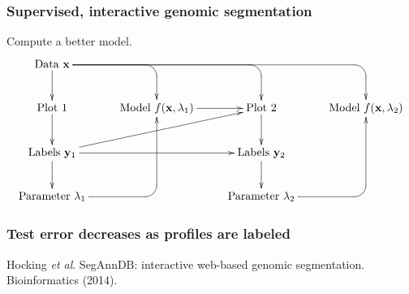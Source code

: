 \documentclass{beamer}
\begin{document}
\begin{frame}
  \frametitle{Supervised, interactive genomic segmentation}
  Compute a better model.
  \small
  \begin{displaymath}
  \xymatrix{
    \text{Data $\mathbf x$}
    \ar `[r] [dr] 
    \ar `r[rr] [drr] 
    \ar `r[rrr] [drrr] 
    \ar [d]
    & \text{ }
    & \text{ }
    & \text{ }
    \\
    \text{Plot 1} 
    \ar [d]
    & 
    \text{Model $f(\mathbf x, \lambda_1)$} 
    \ar [r]
    &
    \text{Plot 2} 
    \ar [d]
    & 
    \text{Model $f(\mathbf x, \lambda_2)$} 
    \\
    \text{Labels $\mathbf y_1$}       
    \ar [d]
    \ar [rr]
    \ar [rru]
    &
    &
    \text{Labels $\mathbf y_2$}
    \ar [d]
    \\
    \text{Parameter $\lambda_1$} 
    \ar `r[ruu] [ruu]
    & \text{ }
    & \text{Parameter $\lambda_2$}
    \ar `r[ruu] [ruu]
  }
  \end{displaymath}
\end{frame}

\begin{frame}
  \frametitle{Test error decreases as profiles are labeled}
  Hocking \textit{et al}. SegAnnDB: interactive web-based genomic
  segmentation. Bioinformatics (2014).
  \begin{center}
    
  \end{center}
\end{frame}
\end{document}

